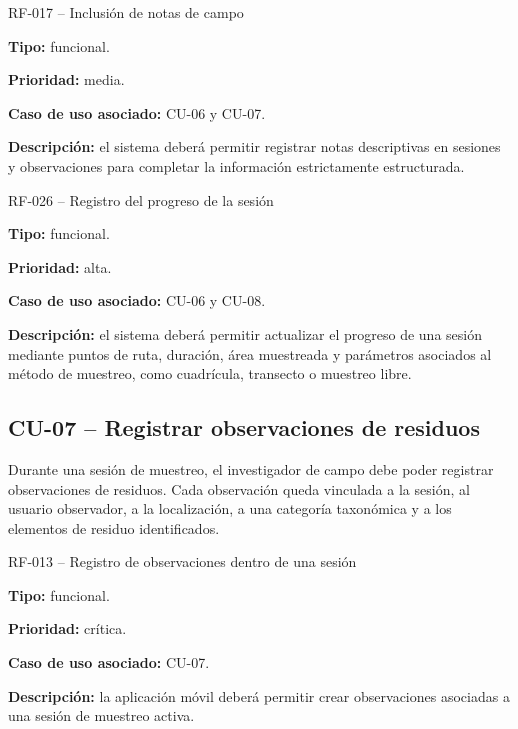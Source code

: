 \begin{requisitocard}{RF-017 -- Inclusión de notas de campo}

\textbf{Tipo:} funcional.

\textbf{Prioridad:} media.

\textbf{Caso de uso asociado:} CU-06 y CU-07.

\textbf{Descripción:} el sistema deberá permitir registrar notas descriptivas en
sesiones y observaciones para completar la información estrictamente estructurada.

\end{requisitocard}

\begin{requisitocard}{RF-026 -- Registro del progreso de la sesión}

\textbf{Tipo:} funcional.

\textbf{Prioridad:} alta.

\textbf{Caso de uso asociado:} CU-06 y CU-08.

\textbf{Descripción:} el sistema deberá permitir actualizar el progreso de una
sesión mediante puntos de ruta, duración, área muestreada y parámetros asociados
al método de muestreo, como cuadrícula, transecto o muestreo libre.

\end{requisitocard}

\subsection{CU-07 -- Registrar observaciones de residuos}

Durante una sesión de muestreo, el investigador de campo debe poder registrar
observaciones de residuos. Cada observación queda vinculada a la sesión, al
usuario observador, a la localización, a una categoría taxonómica y a los
elementos de residuo identificados.

\begin{requisitocard}{RF-013 -- Registro de observaciones dentro de una sesión}

\textbf{Tipo:} funcional.

\textbf{Prioridad:} crítica.

\textbf{Caso de uso asociado:} CU-07.

\textbf{Descripción:} la aplicación móvil deberá permitir crear observaciones
asociadas a una sesión de muestreo activa.

\end{requisitocard}

